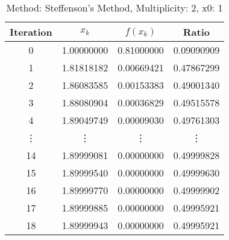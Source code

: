 \begin{table}
\centering
\caption{Method: Steffenson's Method, Multiplicity: 2, x0: 1}
\label{tab:table_Steffenson's_Method_2_1}
\begin{tabular}{c c c c}
\toprule
Iteration &      $x_k$ &   $f(x_k)$ &      Ratio \\
\midrule
        0 & 1.00000000 & 0.81000000 & 0.09090909 \\
        1 & 1.81818182 & 0.00669421 & 0.47867299 \\
        2 & 1.86083585 & 0.00153383 & 0.49001340 \\
        3 & 1.88080904 & 0.00036829 & 0.49515578 \\
        4 & 1.89049749 & 0.00009030 & 0.49761303 \\
   \vdots &     \vdots &     \vdots &     \vdots \\
       14 & 1.89999081 & 0.00000000 & 0.49999828 \\
       15 & 1.89999540 & 0.00000000 & 0.49999630 \\
       16 & 1.89999770 & 0.00000000 & 0.49999902 \\
       17 & 1.89999885 & 0.00000000 & 0.49995921 \\
       18 & 1.89999943 & 0.00000000 & 0.49995921 \\
\bottomrule
\end{tabular}
\end{table}
